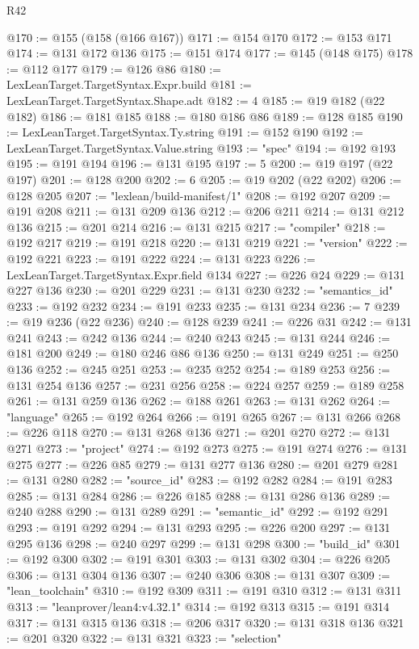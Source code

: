 \begin{lexlean}{R42}
\begin{coremodule}
@170 := @155 (@158 (@166 @167))
@171 := @154 @170
@172 := @153 @171
@174 := @131 @172 @136
@175 := @151 @174
@177 := @145 (@148 @175)
@178 := @112 @177
@179 := @126 @86
@180 := LexLeanTarget.TargetSyntax.Expr.build
@181 := LexLeanTarget.TargetSyntax.Shape.adt
@182 := 4
@185 := @19 @182 (@22 @182)
@186 := @181 @185
@188 := @180 @186 @86
@189 := @128 @185
@190 := LexLeanTarget.TargetSyntax.Ty.string
@191 := @152 @190
@192 := LexLeanTarget.TargetSyntax.Value.string
@193 := "spec"
@194 := @192 @193
@195 := @191 @194
@196 := @131 @195
@197 := 5
@200 := @19 @197 (@22 @197)
@201 := @128 @200
@202 := 6
@205 := @19 @202 (@22 @202)
@206 := @128 @205
@207 := "lexlean/build-manifest/1"
@208 := @192 @207
@209 := @191 @208
@211 := @131 @209 @136
@212 := @206 @211
@214 := @131 @212 @136
@215 := @201 @214
@216 := @131 @215
@217 := "compiler"
@218 := @192 @217
@219 := @191 @218
@220 := @131 @219
@221 := "version"
@222 := @192 @221
@223 := @191 @222
@224 := @131 @223
@226 := LexLeanTarget.TargetSyntax.Expr.field @134
@227 := @226 @24
@229 := @131 @227 @136
@230 := @201 @229
@231 := @131 @230
@232 := "semantics_id"
@233 := @192 @232
@234 := @191 @233
@235 := @131 @234
@236 := 7
@239 := @19 @236 (@22 @236)
@240 := @128 @239
@241 := @226 @31
@242 := @131 @241
@243 := @242 @136
@244 := @240 @243
@245 := @131 @244
@246 := @181 @200
@249 := @180 @246 @86 @136
@250 := @131 @249
@251 := @250 @136
@252 := @245 @251
@253 := @235 @252
@254 := @189 @253
@256 := @131 @254 @136
@257 := @231 @256
@258 := @224 @257
@259 := @189 @258
@261 := @131 @259 @136
@262 := @188 @261
@263 := @131 @262
@264 := "language"
@265 := @192 @264
@266 := @191 @265
@267 := @131 @266
@268 := @226 @118
@270 := @131 @268 @136
@271 := @201 @270
@272 := @131 @271
@273 := "project"
@274 := @192 @273
@275 := @191 @274
@276 := @131 @275
@277 := @226 @85
@279 := @131 @277 @136
@280 := @201 @279
@281 := @131 @280
@282 := "source_id"
@283 := @192 @282
@284 := @191 @283
@285 := @131 @284
@286 := @226 @185
@288 := @131 @286 @136
@289 := @240 @288
@290 := @131 @289
@291 := "semantic_id"
@292 := @192 @291
@293 := @191 @292
@294 := @131 @293
@295 := @226 @200
@297 := @131 @295 @136
@298 := @240 @297
@299 := @131 @298
@300 := "build_id"
@301 := @192 @300
@302 := @191 @301
@303 := @131 @302
@304 := @226 @205
@306 := @131 @304 @136
@307 := @240 @306
@308 := @131 @307
@309 := "lean_toolchain"
@310 := @192 @309
@311 := @191 @310
@312 := @131 @311
@313 := "leanprover/lean4:v4.32.1"
@314 := @192 @313
@315 := @191 @314
@317 := @131 @315 @136
@318 := @206 @317
@320 := @131 @318 @136
@321 := @201 @320
@322 := @131 @321
@323 := "selection"

\end{coremodule}
\end{lexlean}
